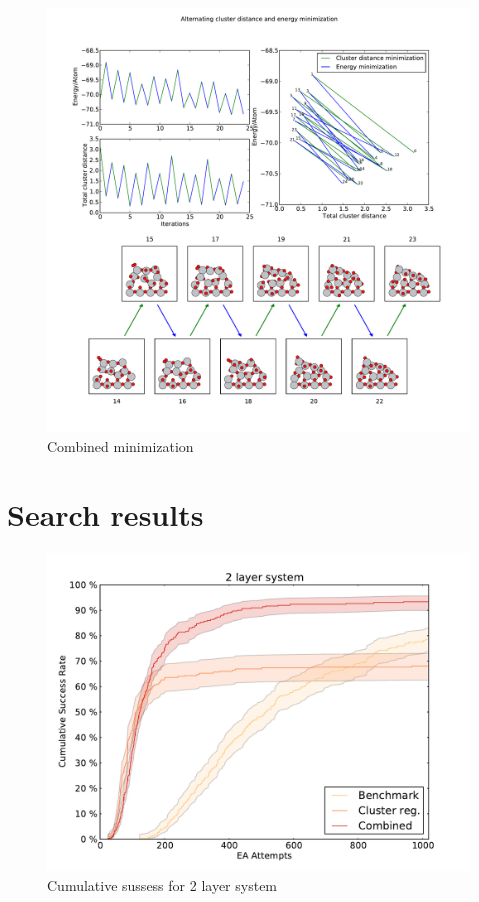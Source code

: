 \documentclass[%
 aps,
 prl,%
 amsmath,amssymb,
 reprint,%
]{revtex4-1}
\begin{document}
\begin{figure}[h]
    \centering
    \includegraphics[width=2.0\columnwidth]{acdminplot_74_98_ridgemin2_5_9_500_Ti13O26Ridge.pdf}
    \caption{Combined minimization}
    \label{fig:fig3}
\end{figure}


\section{Search results}

\begin{figure}[h]
    \centering
    \includegraphics[width=1.0\columnwidth]{2lsuccess.pdf}
    \caption{Cumulative sussess for 2 layer system}
    \label{fig:fig4}
\end{figure}
\end{document}
